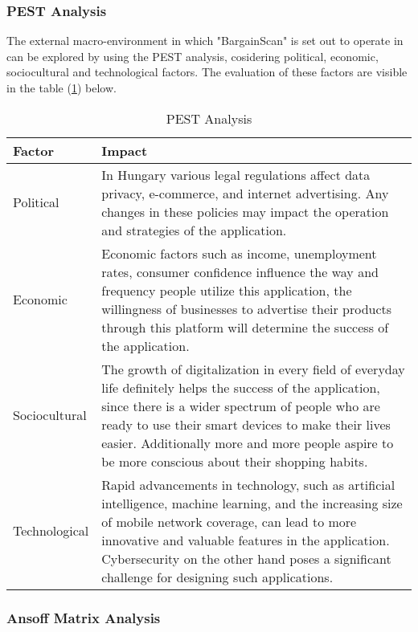 \pagebreak

\subsubsection{PEST Analysis}

The external macro-environment in which "BargainScan" is set out to operate in can be explored by using the PEST analysis, cosidering political, economic, sociocultural and technological factors. The evaluation of these factors are visible in the table (\ref{tab:pest}) below.

\begin{table}[h]
	\centering
	\begin{tabularx}{\textwidth}{|p{2.3cm}|X|}
		\hline
		\textbf{Factor} & \textbf{Impact} \\
		\hline
		Political & In Hungary various legal regulations affect data privacy, e-commerce, and internet advertising. Any changes in these policies may impact the operation and strategies of the application. \\
		\hline
		Economic & Economic factors such as income, unemployment rates, consumer confidence influence the way and frequency people utilize this application, the willingness of businesses to advertise their products through this platform will determine the success of the application. \\
		\hline
		Sociocultural & The growth of digitalization in every field of everyday life definitely helps the success of the application, since there is a wider spectrum of people who are ready to use their smart devices to make their lives easier. Additionally more and more people aspire to be more conscious about their shopping habits.\\
		\hline
		Technological & Rapid advancements in technology, such as artificial intelligence, machine learning, and the increasing size of mobile network coverage, can lead to more innovative and valuable features in the application. Cybersecurity on the other hand poses a significant challenge for designing such applications. \\
		\hline
	\end{tabularx}
	\caption{PEST Analysis}
	\label{tab:pest}
\end{table}

\subsubsection{Ansoff Matrix Analysis}

